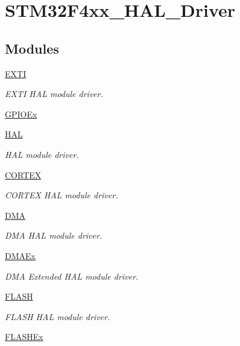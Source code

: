 \hypertarget{group___s_t_m32_f4xx___h_a_l___driver}{}\section{S\+T\+M32\+F4xx\+\_\+\+H\+A\+L\+\_\+\+Driver}
\label{group___s_t_m32_f4xx___h_a_l___driver}
\subsection*{Modules}
\begin{DoxyCompactItemize}
\item 
\hyperlink{group___e_x_t_i}{E\+X\+TI}
\begin{DoxyCompactList}\small\item\em E\+X\+TI H\+AL module driver. \end{DoxyCompactList}\item 
\hyperlink{group___g_p_i_o_ex}{G\+P\+I\+O\+Ex}
\item 
\hyperlink{group___h_a_l}{H\+AL}
\begin{DoxyCompactList}\small\item\em H\+AL module driver. \end{DoxyCompactList}\item 
\hyperlink{group___c_o_r_t_e_x}{C\+O\+R\+T\+EX}
\begin{DoxyCompactList}\small\item\em C\+O\+R\+T\+EX H\+AL module driver. \end{DoxyCompactList}\item 
\hyperlink{group___d_m_a}{D\+MA}
\begin{DoxyCompactList}\small\item\em D\+MA H\+AL module driver. \end{DoxyCompactList}\item 
\hyperlink{group___d_m_a_ex}{D\+M\+A\+Ex}
\begin{DoxyCompactList}\small\item\em D\+MA Extended H\+AL module driver. \end{DoxyCompactList}\item 
\hyperlink{group___f_l_a_s_h}{F\+L\+A\+SH}
\begin{DoxyCompactList}\small\item\em F\+L\+A\+SH H\+AL module driver. \end{DoxyCompactList}\item 
\hyperlink{group___f_l_a_s_h_ex}{F\+L\+A\+S\+H\+Ex}

\end{DoxyCompactItemize}
